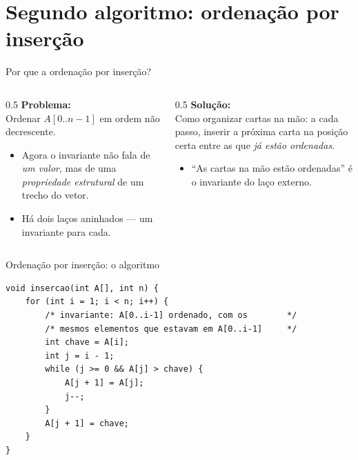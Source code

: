 \documentclass[aspectratio=169]{beamer}
\begin{document}
\section{Segundo algoritmo: ordenação por inserção}

\begin{frame}{Por que a ordenação por inserção?}
  \begin{columns}[T]
    \begin{column}{0.5\textwidth}
      \textbf{Problema:}\\[2pt]
      Ordenar $A[0..n-1]$ em ordem não decrescente.
      \begin{itemize}
        \item Agora o invariante não fala de \emph{um valor}, mas de uma
          \emph{propriedade estrutural} de um trecho do vetor.
        \item Há dois laços aninhados --- um invariante para cada.
      \end{itemize}
    \end{column}
    \begin{column}{0.5\textwidth}
      \textbf{Solução:}\\[2pt]
      Como organizar cartas na mão: a cada passo, inserir a próxima carta na posição
      certa entre as que \emph{já estão ordenadas}.
      \begin{itemize}
        \item ``As cartas na mão estão ordenadas'' é o invariante do laço externo.
      \end{itemize}
    \end{column}
  \end{columns}
\end{frame}

\begin{frame}[fragile]{Ordenação por inserção: o algoritmo}
\begin{lstlisting}
void insercao(int A[], int n) {
    for (int i = 1; i < n; i++) {
        /* invariante: A[0..i-1] ordenado, com os        */
        /* mesmos elementos que estavam em A[0..i-1]     */
        int chave = A[i];
        int j = i - 1;
        while (j >= 0 && A[j] > chave) {
            A[j + 1] = A[j];
            j--;
        }
        A[j + 1] = chave;
    }
}
\end{lstlisting}
\end{frame}
\end{document}
